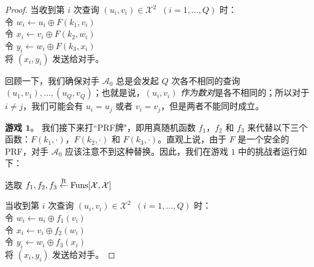\begin{proof}
\hspace*{5pt} 当收到第 $i$ 次查询 $(u_i,v_i)\in\mathcal{X}^2\;\;(i=1,\dots,Q)$ 时：\\
\hspace*{50pt} 令 $w_i\leftarrow u_i\oplus F(k_1,v_i)$\\
\hspace*{50pt} 令 $x_i\leftarrow v_i\oplus F(k_2,w_i)$\\
\hspace*{50pt} 令 $y_i\leftarrow w_i\oplus F(k_3,x_i)$\\
\hspace*{50pt} 将 $(x_i,y_i)$ 发送给对手。

\vspace{10pt}

\noindent
回顾一下，我们确保对手 $\mathcal{A}_0$ 总是会发起 $Q$ 次各不相同的查询 $(u_1,v_1),\dots,(u_Q,v_Q)$；也就是说，$(u_i,v_i)$ \emph{作为数对}是各不相同的；所以对于 $i\neq j$，我们可能会有 $u_i=u_j$ 或者 $v_i=v_j$，但是两者不能同时成立。

\vspace{5pt}

\noindent
\textbf{游戏 $\mathbf{1}$}。
我们接下来打``PRF牌"，即用真随机函数 $f_1$，$f_2$ 和 $f_3$ 来代替以下三个函数：$F(k_1,\cdot)$，$F(k_2,\cdot)$ 和 $F(k_3,\cdot)$。直观上说，由于 $F$ 是一个安全的 PRF，对手 $\mathcal{A}_0$ 应该注意不到这种替换。因此，我们在游戏 $1$ 中的挑战者运行如下：

\vspace{10pt}

\hspace*{5pt} 选取 $f_1,f_2,f_3\overset{\rm R}\leftarrow{\rm Funs}[\mathcal{X},\mathcal{X}]$

\vspace{5pt}

\hspace*{5pt} 当收到第 $i$ 次查询 $(u_i,v_i)\in\mathcal{X}^2\;\;(i=1,\dots,Q)$ 时：\\
\hspace*{50pt} 令 $w_i\leftarrow u_i\oplus f_1(v_i)$\\
\hspace*{50pt} 令 $x_i\leftarrow v_i\oplus f_2(w_i)$\\
\hspace*{50pt} 令 $y_i\leftarrow w_i\oplus f_3(x_i)$\\
\hspace*{50pt} 将 $(x_i,y_i)$ 发送给对手。

\vspace{10pt}


\end{proof}
